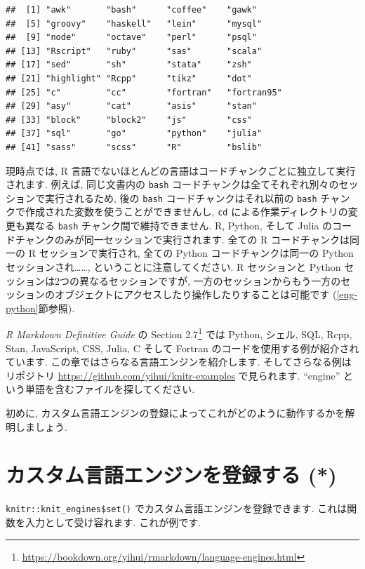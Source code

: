 \documentclass[
  11pt,
  lualatex,
  ja=standard]{bxjsreport}
\renewcommand{\href}[2]{#2\footnote{\url{#1}}}
\begin{document}
\begin{verbatim}
##  [1] "awk"       "bash"      "coffee"    "gawk"     
##  [5] "groovy"    "haskell"   "lein"      "mysql"    
##  [9] "node"      "octave"    "perl"      "psql"     
## [13] "Rscript"   "ruby"      "sas"       "scala"    
## [17] "sed"       "sh"        "stata"     "zsh"      
## [21] "highlight" "Rcpp"      "tikz"      "dot"      
## [25] "c"         "cc"        "fortran"   "fortran95"
## [29] "asy"       "cat"       "asis"      "stan"     
## [33] "block"     "block2"    "js"        "css"      
## [37] "sql"       "go"        "python"    "julia"    
## [41] "sass"      "scss"      "R"         "bslib"
\end{verbatim}

現時点では, R 言語でないほとんどの言語はコードチャンクごとに独立して実行されます. 例えば, 同じ文書内の \texttt{bash} コードチャンクは全てそれぞれ別々のセッションで実行されるため, 後の \texttt{bash} コードチャンクはそれ以前の \texttt{bash} チャンクで作成された変数を使うことができませんし, \texttt{cd} による作業ディレクトリの変更も異なる \texttt{bash} チャンク間で維持できません. R, Python, そして Julia のコードチャンクのみが同一セッションで実行されます. 全ての R コードチャンクは同一の R セッションで実行され, 全ての Python コードチャンクは同一の Python セッションされ\ldots\ldots, ということに注意してください. R セッションと Python セッションは2つの異なるセッションですが, 一方のセッションからもう一方のセッションのオブジェクトにアクセスしたり操作したりすることは可能です (\ref{eng-python}節参照).

\emph{R Markdown Definitive Guide} \autocite{rmarkdown2018} の \href{https://bookdown.org/yihui/rmarkdown/language-engines.html}{Section 2.7} では Python, シェル, SQL, Rcpp, Stan, JavaScript, CSS, Julia, C そして Fortran のコードを使用する例が紹介されています. この章ではさらなる言語エンジンを紹介します. そしてさらなる例はリポジトリ \url{https://github.com/yihui/knitr-examples} で見られます. ``engine'' という単語を含むファイルを探してください.

初めに, カスタム言語エンジンの登録によってこれがどのように動作するかを解明しましょう.

\hypertarget{custom-engine}{%
\section{カスタム言語エンジンを登録する (*)}\label{custom-engine}}

\texttt{knitr::knit\_engines\$set()} でカスタム言語エンジンを登録できます. これは関数を入力として受け容れます. これが例です.
\end{document}
